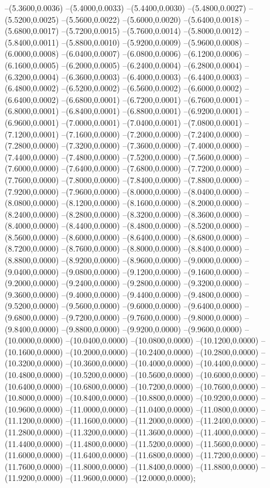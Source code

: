 {	--(5.3600,0.0036)
	--(5.4000,0.0033)
	--(5.4400,0.0030)
	--(5.4800,0.0027)
	--(5.5200,0.0025)
	--(5.5600,0.0022)
	--(5.6000,0.0020)
	--(5.6400,0.0018)
	--(5.6800,0.0017)
	--(5.7200,0.0015)
	--(5.7600,0.0014)
	--(5.8000,0.0012)
	--(5.8400,0.0011)
	--(5.8800,0.0010)
	--(5.9200,0.0009)
	--(5.9600,0.0008)
	--(6.0000,0.0008)
	--(6.0400,0.0007)
	--(6.0800,0.0006)
	--(6.1200,0.0006)
	--(6.1600,0.0005)
	--(6.2000,0.0005)
	--(6.2400,0.0004)
	--(6.2800,0.0004)
	--(6.3200,0.0004)
	--(6.3600,0.0003)
	--(6.4000,0.0003)
	--(6.4400,0.0003)
	--(6.4800,0.0002)
	--(6.5200,0.0002)
	--(6.5600,0.0002)
	--(6.6000,0.0002)
	--(6.6400,0.0002)
	--(6.6800,0.0001)
	--(6.7200,0.0001)
	--(6.7600,0.0001)
	--(6.8000,0.0001)
	--(6.8400,0.0001)
	--(6.8800,0.0001)
	--(6.9200,0.0001)
	--(6.9600,0.0001)
	--(7.0000,0.0001)
	--(7.0400,0.0001)
	--(7.0800,0.0001)
	--(7.1200,0.0001)
	--(7.1600,0.0000)
	--(7.2000,0.0000)
	--(7.2400,0.0000)
	--(7.2800,0.0000)
	--(7.3200,0.0000)
	--(7.3600,0.0000)
	--(7.4000,0.0000)
	--(7.4400,0.0000)
	--(7.4800,0.0000)
	--(7.5200,0.0000)
	--(7.5600,0.0000)
	--(7.6000,0.0000)
	--(7.6400,0.0000)
	--(7.6800,0.0000)
	--(7.7200,0.0000)
	--(7.7600,0.0000)
	--(7.8000,0.0000)
	--(7.8400,0.0000)
	--(7.8800,0.0000)
	--(7.9200,0.0000)
	--(7.9600,0.0000)
	--(8.0000,0.0000)
	--(8.0400,0.0000)
	--(8.0800,0.0000)
	--(8.1200,0.0000)
	--(8.1600,0.0000)
	--(8.2000,0.0000)
	--(8.2400,0.0000)
	--(8.2800,0.0000)
	--(8.3200,0.0000)
	--(8.3600,0.0000)
	--(8.4000,0.0000)
	--(8.4400,0.0000)
	--(8.4800,0.0000)
	--(8.5200,0.0000)
	--(8.5600,0.0000)
	--(8.6000,0.0000)
	--(8.6400,0.0000)
	--(8.6800,0.0000)
	--(8.7200,0.0000)
	--(8.7600,0.0000)
	--(8.8000,0.0000)
	--(8.8400,0.0000)
	--(8.8800,0.0000)
	--(8.9200,0.0000)
	--(8.9600,0.0000)
	--(9.0000,0.0000)
	--(9.0400,0.0000)
	--(9.0800,0.0000)
	--(9.1200,0.0000)
	--(9.1600,0.0000)
	--(9.2000,0.0000)
	--(9.2400,0.0000)
	--(9.2800,0.0000)
	--(9.3200,0.0000)
	--(9.3600,0.0000)
	--(9.4000,0.0000)
	--(9.4400,0.0000)
	--(9.4800,0.0000)
	--(9.5200,0.0000)
	--(9.5600,0.0000)
	--(9.6000,0.0000)
	--(9.6400,0.0000)
	--(9.6800,0.0000)
	--(9.7200,0.0000)
	--(9.7600,0.0000)
	--(9.8000,0.0000)
	--(9.8400,0.0000)
	--(9.8800,0.0000)
	--(9.9200,0.0000)
	--(9.9600,0.0000)
	--(10.0000,0.0000)
	--(10.0400,0.0000)
	--(10.0800,0.0000)
	--(10.1200,0.0000)
	--(10.1600,0.0000)
	--(10.2000,0.0000)
	--(10.2400,0.0000)
	--(10.2800,0.0000)
	--(10.3200,0.0000)
	--(10.3600,0.0000)
	--(10.4000,0.0000)
	--(10.4400,0.0000)
	--(10.4800,0.0000)
	--(10.5200,0.0000)
	--(10.5600,0.0000)
	--(10.6000,0.0000)
	--(10.6400,0.0000)
	--(10.6800,0.0000)
	--(10.7200,0.0000)
	--(10.7600,0.0000)
	--(10.8000,0.0000)
	--(10.8400,0.0000)
	--(10.8800,0.0000)
	--(10.9200,0.0000)
	--(10.9600,0.0000)
	--(11.0000,0.0000)
	--(11.0400,0.0000)
	--(11.0800,0.0000)
	--(11.1200,0.0000)
	--(11.1600,0.0000)
	--(11.2000,0.0000)
	--(11.2400,0.0000)
	--(11.2800,0.0000)
	--(11.3200,0.0000)
	--(11.3600,0.0000)
	--(11.4000,0.0000)
	--(11.4400,0.0000)
	--(11.4800,0.0000)
	--(11.5200,0.0000)
	--(11.5600,0.0000)
	--(11.6000,0.0000)
	--(11.6400,0.0000)
	--(11.6800,0.0000)
	--(11.7200,0.0000)
	--(11.7600,0.0000)
	--(11.8000,0.0000)
	--(11.8400,0.0000)
	--(11.8800,0.0000)
	--(11.9200,0.0000)
	--(11.9600,0.0000)
	--(12.0000,0.0000);
}
